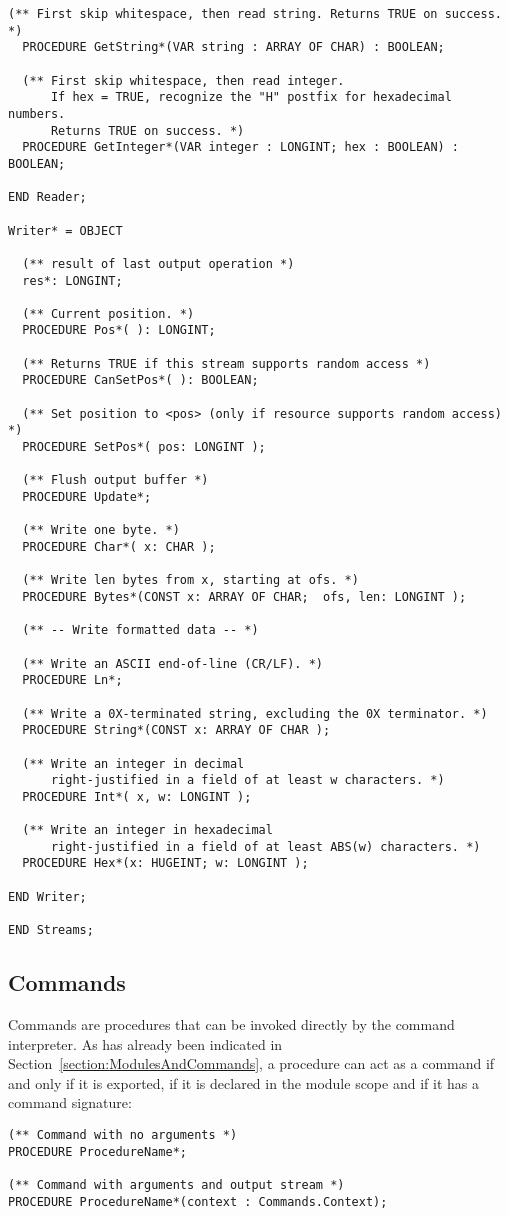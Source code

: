 \documentclass[a4paper,11pt]{article}
\begin{document}
\begin{lstlisting}[language=Oberon,frame=none,caption={Simplified Reader and Writer Interface}]
  (** First skip whitespace, then read string. Returns TRUE on success. *)
  PROCEDURE GetString*(VAR string : ARRAY OF CHAR) : BOOLEAN;

  (** First skip whitespace, then read integer.
      If hex = TRUE, recognize the "H" postfix for hexadecimal numbers.
      Returns TRUE on success. *)
  PROCEDURE GetInteger*(VAR integer : LONGINT; hex : BOOLEAN) : BOOLEAN;

END Reader;

Writer* = OBJECT

  (** result of last output operation *)
  res*: LONGINT;

  (** Current position. *)
  PROCEDURE Pos*( ): LONGINT;

  (** Returns TRUE if this stream supports random access *)
  PROCEDURE CanSetPos*( ): BOOLEAN;

  (** Set position to <pos> (only if resource supports random access) *)
  PROCEDURE SetPos*( pos: LONGINT );

  (** Flush output buffer *)
  PROCEDURE Update*;

  (** Write one byte. *)
  PROCEDURE Char*( x: CHAR );

  (** Write len bytes from x, starting at ofs. *)
  PROCEDURE Bytes*(CONST x: ARRAY OF CHAR;  ofs, len: LONGINT );

  (** -- Write formatted data -- *)

  (** Write an ASCII end-of-line (CR/LF). *)
  PROCEDURE Ln*;

  (** Write a 0X-terminated string, excluding the 0X terminator. *)
  PROCEDURE String*(CONST x: ARRAY OF CHAR );

  (** Write an integer in decimal
      right-justified in a field of at least w characters. *)
  PROCEDURE Int*( x, w: LONGINT );

  (** Write an integer in hexadecimal
      right-justified in a field of at least ABS(w) characters. *)
  PROCEDURE Hex*(x: HUGEINT; w: LONGINT );

END Writer;

END Streams;
\end{lstlisting}

\subsection{Commands}
Commands are procedures that can be invoked directly by the command interpreter. As has already been indicated in Section~\ref{section:ModulesAndCommands}, a procedure can act as a command if and only if it is exported, if it is declared in the module scope and if it has a command signature:
\begin{lstlisting}[language=Oberon,frame=none,caption={Command Signatures}]
(** Command with no arguments *)
PROCEDURE ProcedureName*;

(** Command with arguments and output stream *)
PROCEDURE ProcedureName*(context : Commands.Context);
\end{lstlisting}
\end{document}
